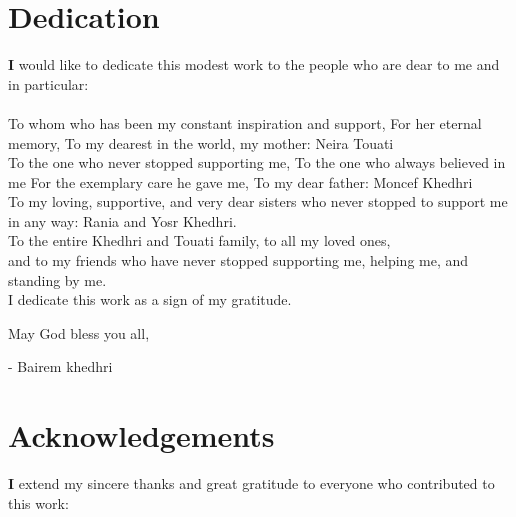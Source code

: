 \section*{Dedication}


\vspace{1cm}
\par \textbf{I} would like to dedicate this modest work to the people who are dear to me and in particular:\\
\\

To whom who has been my constant inspiration and support, For her eternal memory, To my dearest in the world, my mother: Neira Touati\\

To the one who never stopped supporting me, To the one who always believed in me For the exemplary care he gave me, To my dear father: Moncef Khedhri\\

To my loving, supportive, and very dear sisters who never stopped to support me in any way: Rania and Yosr Khedhri.\\

To the entire Khedhri and Touati family, to all my loved ones,\\

and to my friends who have never stopped supporting me, helping me, and standing by me. \\

I dedicate this work as a sign of my gratitude.

\vspace*{\fill}

May God bless you all,

\begin{flushright}
- Bairem khedhri
\end{flushright}

\clearpage

\section*{Acknowledgements}


\vspace{1cm}
\par \textbf{I} extend my sincere thanks and great gratitude to everyone who contributed to this work:\\
\\

